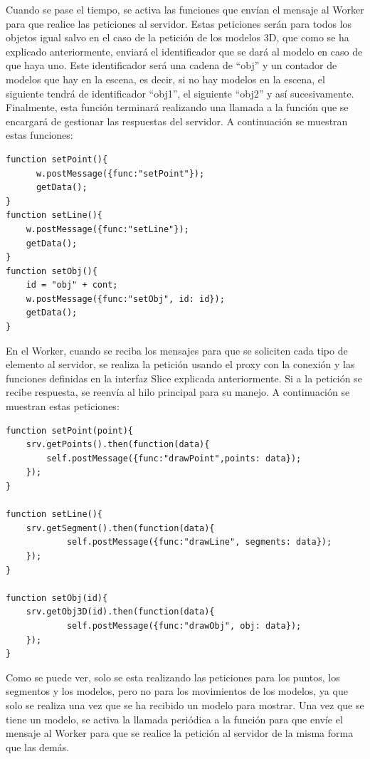 Cuando se pase el tiempo, se activa las funciones que envían el mensaje al Worker para que realice las peticiones al servidor. Estas peticiones serán para todos los objetos igual salvo en el caso de la petición de los modelos 3D, que como se ha explicado anteriormente, enviará el identificador que se dará al modelo en caso de que haya uno. Este identificador será una cadena de ``obj'' y un contador de modelos que hay en la escena, es decir, si no hay modelos en la escena, el siguiente tendrá de identificador ``obj1'', el siguiente ``obj2'' y así sucesivamente. Finalmente, esta función terminará realizando una llamada a la función que se encargará de gestionar las respuestas del servidor. A continuación se muestran estas funciones:

\begin{lstlisting}[frame=single]
function setPoint(){
      w.postMessage({func:"setPoint"});
      getData();
}
function setLine(){
	w.postMessage({func:"setLine"});
	getData();
}
function setObj(){
	id = "obj" + cont;
	w.postMessage({func:"setObj", id: id});
	getData();
}
\end{lstlisting}

En el Worker, cuando se reciba los mensajes para que se soliciten cada tipo de elemento al servidor, se realiza la petición usando el proxy con la conexión y las funciones definidas en la interfaz Slice explicada anteriormente. Si a la petición se recibe respuesta, se reenvía al hilo principal para su manejo. A continuación se muestran estas peticiones:

\begin{lstlisting}[frame=single]
function setPoint(point){
 	srv.getPoints().then(function(data){
		self.postMessage({func:"drawPoint",points: data});
	});
}

function setLine(){
	srv.getSegment().then(function(data){
      		self.postMessage({func:"drawLine", segments: data});
  	});
}

function setObj(id){
  	srv.getObj3D(id).then(function(data){
    		self.postMessage({func:"drawObj", obj: data});
  	});
}
\end{lstlisting}

Como se puede ver, solo se esta realizando las peticiones para los puntos, los segmentos y los modelos, pero no para los movimientos de los modelos, ya que solo se realiza una vez que se ha recibido un modelo para mostrar. Una vez que se tiene un modelo, se activa la llamada periódica a la función para que envíe el mensaje al Worker para que se realice la petición al servidor de la misma forma que las demás.

